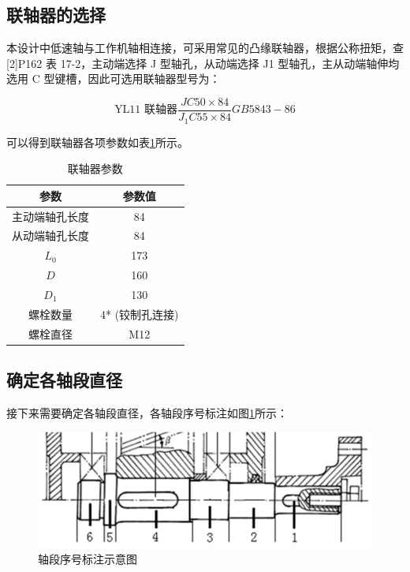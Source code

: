 \documentclass[12pt]{ctexart}
\begin{document}
\subsection{联轴器的选择}

本设计中低速轴与工作机轴相连接，可采用常见的凸缘联轴器，根据公称扭矩，查 [2]P162 表 17-2，主动端选择 J 型轴孔，从动端选择 J1 型轴孔，主从动端轴伸均选用 C 型键槽，因此可选用联轴器型号为：

$$ \text{YL11 联轴器} \frac{JC50\times 84}{J_1C55\times 84}GB5843-86 $$ 

可以得到联轴器各项参数如表\ref{table28}所示。

\begin{table}[htbp]
    \centering
    \setlength{\belowcaptionskip}{0.3cm}
    \caption{联轴器参数}
    \begin{tabular}{c c}
        \toprule
        参数 & 参数值 \\
        \midrule
        主动端轴孔长度   & 84 \\
        从动端轴孔长度   & 84 \\
        $L_0$           & 173 \\
        $D$             & 160 \\
        $D_1$          & 130 \\
        螺栓数量        & 4* (铰制孔连接)\\
        螺栓直径        & M12\\
        \bottomrule
    \end{tabular}

    \label{table28}
\end{table}

\subsection{确定各轴段直径}

接下来需要确定各轴段直径，各轴段序号标注如图\ref{figure8}所示：

\begin{figure}[htbp]
    \centering
    \includegraphics[scale=0.2]{roller.png}
    \caption{轴段序号标注示意图}\label{figure8}
\end{figure}
\end{document}
